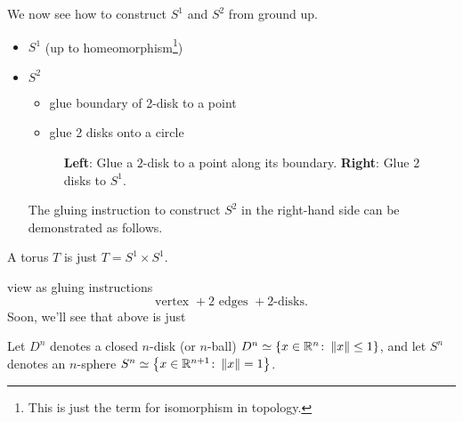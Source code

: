 \begin{eg}
	We now see how to construct \(S^1\) and \(S^2\) from ground up.
	\begin{itemize}
		\item \(S^1\) (up to homeomorphism\footnote{This is just the term for isomorphism in topology.})
		      \begin{figure}[H]
			      \centering
			      \label{fig:eg:constructing-sphere-1}
		      \end{figure}
		\item \(S^2\)
		      \begin{itemize}
			      \item glue boundary of 2-disk to a point
			      \item glue 2 disks onto a circle
		      \end{itemize}
		      \begin{figure}[H]
			      \centering
			      \caption{\textbf{Left}: Glue a \(2\)-disk to a point along its boundary. \textbf{Right}: Glue \(2\) disks to \(S^1\).}
			      \label{fig:eg:constructing-sphere-2}
		      \end{figure}
		      The gluing instruction to construct \(S^2\) in the right-hand side can be demonstrated as follows.
		      \begin{figure}[H]
			      \centering
			      \label{fig:eg:constructing-sphere-2-gluing-instr}
		      \end{figure}
	\end{itemize}
\end{eg}
\begin{eg}
	A torus \(T\) is just \(T = S^1 \times S^1\).
	\begin{figure}[H]
		\centering
		\label{fig:eg:constructing-torus}
	\end{figure}
	view as gluing instructions
	\[
		\text{vertex }+ 2 \text{ edges }+2\text{-disks}.
	\]
	Soon, we'll see that above is just
	\begin{figure}[H]
		\centering
		\label{fig:eg:constructing-torus-gluing-instr}
	\end{figure}
\end{eg}


\begin{notation}
	Let \(D^n\) denotes a closed \(n\)-disk (or \(n\)-ball) \(D^n\simeq \left\{x\in\mathbb{\MakeUppercase{R}} ^n\colon \left\lVert x\right\rVert \leq 1\right\}\),
	and let \(S^n\) denotes an \(n\)-sphere \(S^n\simeq \left\{x\in \mathbb{\MakeUppercase{R}}^{n+1}\colon \left\lVert x\right\rVert = 1\right\}\).
\end{notation}

